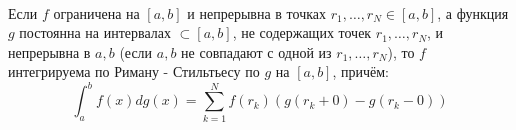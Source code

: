 \begin{note}\\
	Если $f$ ограничена на $[a,b]$ и непрерывна в точках $r_1,\dots,r_N\in[a,b]$, а функция $g$ постоянна на интервалах $\subset[a,b]$, не содержащих точек $r_1,\dots,r_N$, и непрерывна в $a,b$ (если $a,b$ не совпадают с одной из $r_1,\dots,r_N$), то $f$ интегрируема по Риману - Стильтьесу по $g$ на $[a,b]$, причём:
	\[\int_a^bf(x)dg(x)=\sum_{k=1}^Nf(r_k)(g(r_k+0)-g(r_k-0))\]
\end{note}